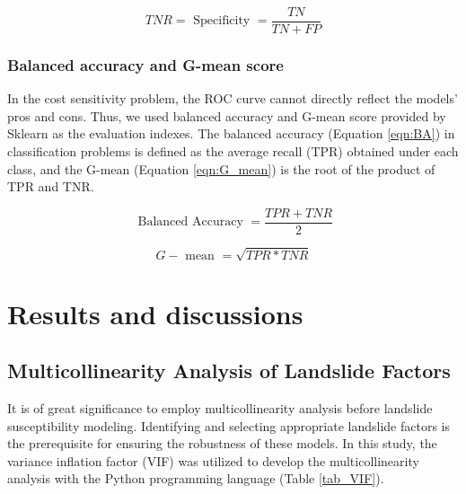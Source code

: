 \documentclass[a4paper,fleqn]{cas-sc}
\begin{document}
\begin{equation}
  T N R=\text { Specificity }=\frac{T N}{T N+F P}
  \label{eqn:TNR}
\end{equation}

\subsubsection{Balanced accuracy and G-mean score}

In the cost sensitivity problem, the ROC curve cannot directly reflect the models' pros and cons. 
Thus, we used balanced accuracy and G-mean score provided by Sklearn \cite{scikit-learn} as the evaluation indexes. The balanced accuracy (Equation \ref{eqn:BA}) in classification problems is defined as the average recall (TPR) obtained under each class, and the G-mean (Equation \ref{eqn:G_mean}) is the root of the product of TPR and TNR. 

\begin{equation}
  \text { Balanced Accuracy }=\frac{T P R+T N R}{2}
  \label{eqn:BA}
\end{equation}

\begin{equation}
  G-\text { mean }=\sqrt{T P R * T N R}
  \label{eqn:G_mean}
\end{equation}

\section{Results and discussions}
\subsection{Multicollinearity Analysis of Landslide Factors}

It is of great significance to employ multicollinearity analysis before landslide susceptibility modeling. 
Identifying and selecting appropriate landslide factors is the prerequisite for ensuring the robustness of these models. 
In this study, the variance inflation factor (VIF) was utilized to develop the multicollinearity analysis with the Python programming language (Table \ref{tab_VIF}). 
\end{document}
